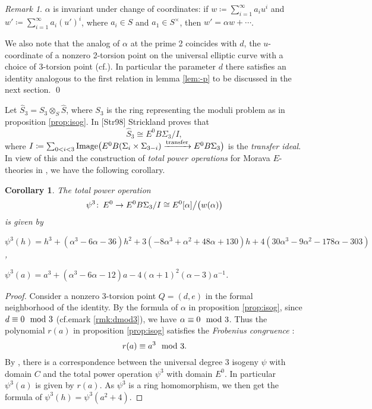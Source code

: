 \documentclass{gtpart}
\newtheorem{cor}[thm]{Corollary}
\theoremstyle{definition}
\theoremstyle{remark}
\newtheorem{rmk}[thm]{Remark}
\def\co{\colon\thinspace}
\newcommand{\cff}[2]{cf.\thinspace{\cite[#1]{#2}}}
\newcommand{\HS}{\widehat{S}}
\newcommand{\md}{~~{\rm mod}~}
\newcommand{\A}{\alpha}
\newcommand{\p}{\psi^3}
\begin{document}
\begin{rmk}
 $\A$ is invariant under change of coordinates: 
 if $w \coloneqq \sum_{i = 1}^\infty a_i u^i$ and $w' \coloneqq \sum_{i = 1}^\infty a_i (u')^i$, 
 where $a_i \in S$ and $a_1 \in S^\times$, then $w' = \A w + \cdots$.  

 We also note that the analog of $\A$ at the prime 2 coincides with $d$, 
 the $u$-coordinate of a nonzero 2-torsion point on the universal elliptic curve with a choice of 3-torsion point (\cff{section 3}{h2p2}).  
 In particular the parameter $d$ there satisfies an identity analogous to the first relation in lemma \ref{lem:-p} to be discussed in the next section.  
\qed
\end{rmk}

Let $\HS_3 = S_3 \otimes_S \HS$, where $S_3$ is the ring representing the moduli problem as in proposition \ref{prop:isog}.  In [Str98] Strickland proves that 
\[
 \HS_3 \cong E^0 B\Sigma_3 / I, 
\]
where $I \coloneqq \sum_{0<i<3} {\rm Image} \big( E^0 B(\Sigma_i \times \Sigma_{3-i}) \xrightarrow{\rm transfer} E^0 B\Sigma_3 \big)$ is the {\em transfer ideal}.  
In view of this and the construction of {\em total power operations} for Morava $E$-theories in \cite[3.23]{cong}, we have the following corollary.  

\begin{cor}
\label{cor:psi3}
 The total power operation 
 \[
  \p \co E^0 \to E^0 B\Sigma_3 / I \cong E^0 [\A] \big/ \big( w(\A) \big) 
 \]
 is given by 
 
 $\p(h) = h^3 + (\A^3 - 6 \A - 36) h^2 + 3 (-8 \A^3 + \A^2 + 48 \A + 130) h + 4 (30 \A^3 - 9 \A^2 - 178 \A - 303)$, 
 
 $\p(a) = a^3 + (\A^3 - 6 \A - 12) a - 4 (\A + 1)^2 (\A - 3) a^{-1}$.  
 
\end{cor}
\begin{proof}
 Consider a nonzero 3-torsion point $Q = (d,e)$ in the formal neighborhood of the identity.  
 By the formula of $\A$ in proposition \ref{prop:isog}, since $d \equiv 0 \md 3$ (cf.emark \ref{rmk:dmod3}), we have $\A \equiv 0 \md 3$.  
 Thus the polynomial $r(a)$ in proposition \ref{prop:isog} satisfies the {\em Frobenius congruence} \cite[11.18 and 11.20]{cong}: 
 \[
  r(a) \equiv a^3 \md 3.  
 \]
 By \cite[theorem B]{cong}, there is a correspondence between the universal degree 3 isogeny $\psi$ with domain $C$ 
 and the total power operation $\p$ with domain $E^0$.  In particular $\p(a)$ is given by $r(a)$.  
 As $\p$ is a ring homomorphism, we then get the formula of $\p(h) = \p(a^2 + 4)$.  
\end{proof}
\end{document}
